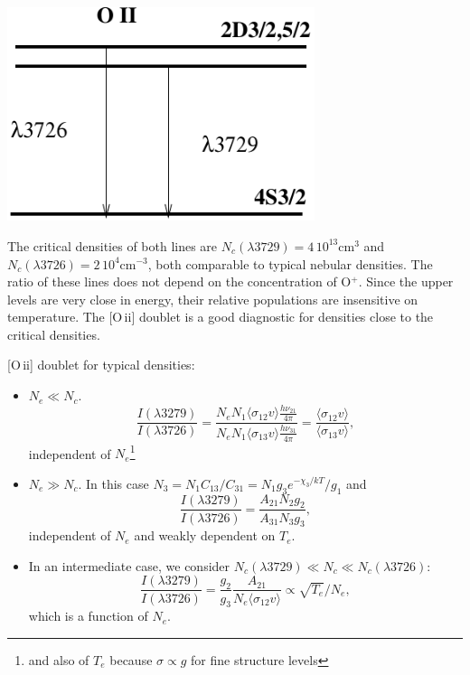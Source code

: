 
\begin{floatingfigure}{12cm}
\includegraphics[width=9cm,height=!]{./C/oii.pdf}
\end{floatingfigure}  \quad  The critical densities of both lines are 
 $N_c(\lambda3729) = 4\,10^{13}$cm$^{3}$ and $N_c(\lambda3726) =
2\,10^{4}$cm$^{-3}$, both comparable to typical nebular densities. The
ratio of these lines does not depend on the concentration of
O$^+$. Since the upper levels are very close in energy, their relative
populations are insensitive on temperature. The [O\,{\sc ii}] doublet
is a good diagnostic for densities close to the critical densities.

\foilhead{}

[O\,{\sc ii}] doublet for typical densities:
\begin{itemize}
\item $N_e \ll N_c$. \[ \frac{I(\lambda 3279)}{I(\lambda 3726)} =\frac{ N_e
N_1  \langle \sigma_{12} v \rangle \frac{h\nu_{21}}{4\pi}}{ N_e
N_1  \langle \sigma_{13} v \rangle \frac{h\nu_{31}}{4\pi}} = \frac{ \langle
\sigma_{12} v  \rangle}{\langle \sigma_{13} v  \rangle},\] independent
of $N_e$\footnote{and also of  $T_e$ because  $\sigma \propto g$ for
fine structure levels}
\item $N_e \gg N_c$. In this case  $N_3 = N_1 C_{13}/C_{31} = N_1 g_3
e^{-\chi_3/kT} / g_1 $  and 
\[\frac{I(\lambda 3279)}{I(\lambda 3726)} = \frac{A_{21}
N_2 g_2 }{A_{31}N_3 g_3}, \] independent of  $N_e$ and weakly
dependent on $T_e$.
\item In an intermediate case, we consider  $N_c(\lambda 3729) \ll N_c
\ll N_c(\lambda 3726)$:
\[\frac{I(\lambda 3279)}{I(\lambda 3726)} = \frac{g_2}{g_3}
\frac{A_{21}}{N_e \langle \sigma_{12} v \rangle} \propto
\sqrt{T_e}/N_e,\]  which is a function of  $N_e$.
\end{itemize}

